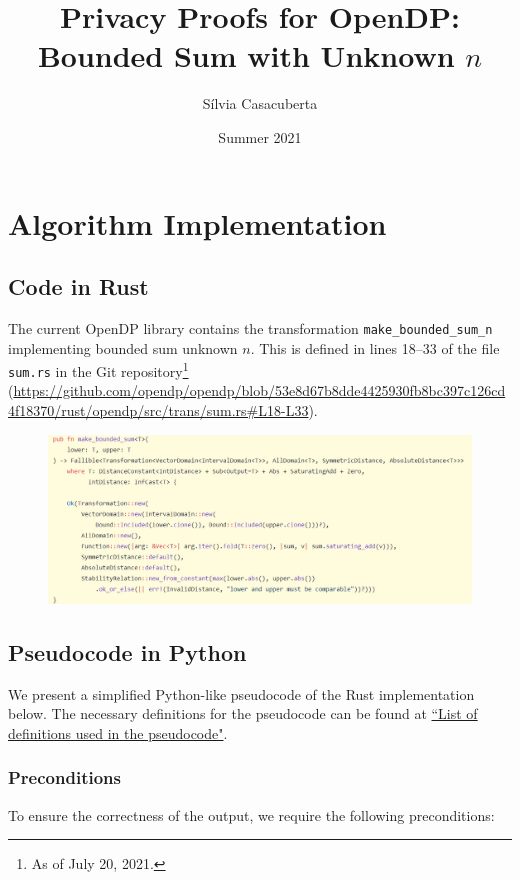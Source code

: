 \documentclass[11pt,a4paper]{article}
\title{Privacy Proofs for OpenDP: Bounded Sum with Unknown $n$}
\author{S\'ilvia Casacuberta}
\date{Summer 2021}
\theoremstyle{definition}
\begin{document}
\maketitle

\tableofcontents

\section{Algorithm Implementation}
\subsection{Code in Rust}
The current OpenDP library contains the transformation \texttt{make\_bounded\_sum\_n} implementing bounded sum unknown $n$. This is defined in lines 18--33 of the file \texttt{sum.rs} in the Git repository\footnote{As of July 20, 2021.} ({\url{https://github.com/opendp/opendp/blob/53e8d67b8dde4425930fb8bc397c126cd4f18370/rust/opendp/src/trans/sum.rs#L18-L33}}).

\begin{figure}[ht]
    \includegraphics[width=15cm]{bounded_sum_3.png}
    \centering
    \label{fig:code}
\end{figure}

\subsection{Pseudocode in Python}
We present a simplified Python-like pseudocode of the Rust implementation below. The necessary definitions for the pseudocode can be found at \href{https://www.overleaf.com/project/60d215bf90b337ac02200a99}{``List of definitions used in the pseudocode"}.

\subsubsection*{Preconditions}
To ensure the correctness of the output, we require the following preconditions:
\end{document}
